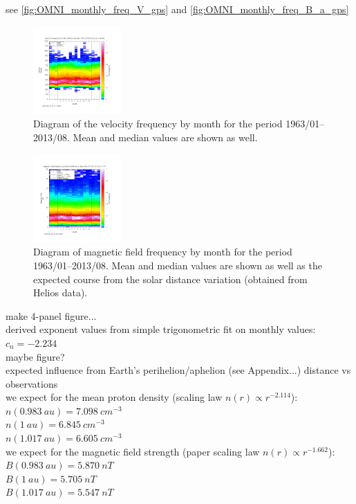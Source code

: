 see \autoref{fig:OMNI_monthly_freq_V_gps} and \autoref{fig:OMNI_monthly_freq_B_a_gps}\\
\begin{figure}[htb]
	\centering
	\includegraphics[width=0.3\textwidth]{figures_of_mine/gnuplots/OMNI_monthly_freq_V_gps.png}
	\caption{Diagram of the velocity frequency by month for the period 1963/01--2013/08. Mean and median values are shown as well.}
	\label{fig:OMNI_monthly_freq_V_gps}
\end{figure}
\begin{figure}[htb]
	\centering
	\includegraphics[width=0.3\textwidth]{figures_of_mine/gnuplots/OMNI_monthly_freq_B_a_gps.png}
	\caption{Diagram of magnetic field frequency by month for the period 1963/01--2013/08. Mean and median values are shown as well as the expected course from the solar distance variation (obtained from Helios data).}
	\label{fig:OMNI_monthly_freq_B_a_gps}
\end{figure}
make 4-panel figure...\\

derived exponent values from simple trigonometric fit on monthly values:\\
$c_n = -2.234$\\
maybe figure?\\

expected influence from Earth's perihelion/aphelion (see Appendix...) distance vs observations\\
we expect for the mean proton density (scaling law $n(r) \propto r^{-2.114}$):\\
$n(0.983~au) = 7.098~cm^{-3}$\\
$n(1~au) = 6.845~cm^{-3}$\\
$n(1.017~au) = 6.605~cm^{-3}$\\
we expect for the magnetic field strength (paper scaling law $n(r) \propto r^{-1.662}$):\\
$B(0.983~au) = 5.870~nT$\\
$B(1~au) = 5.705~nT$\\
$B(1.017~au) = 5.547~nT$\\


